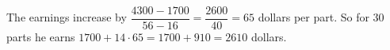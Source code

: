 The earnings increase by $\dfrac{4300-1700}{56-16}=\dfrac{2600}{40}=65$ dollars per part. So for $30$ parts he earns $1700+14\cdot65=1700+910=\boxed{2610}$ dollars.
